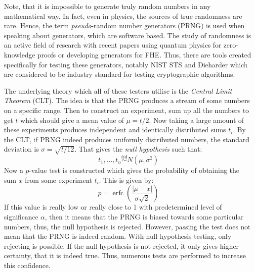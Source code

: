 \documentclass{Resources/UoBLab1}
\theoremstyle{definition}
\begin{document}
Note, that it is impossible to generate truly random numbers in any mathematical way. In fact, even in physics, the sources of true randomness are rare. Hence, the term \textit{pseudo}-random number generators (PRNG) is used when speaking about generators, which are software based. The study of randomness is an active field of research with recent papers using quantum physics for zero-knowledge proofs\cite{QuantumZK} or developing generators for FHE\cite{LatticeRNG}. Thus, there are tools created specifically for testing these generators, notably NIST STS\cite{NIST} and Dieharder\cite{Dieharder} which are considered to be industry standard for testing cryptographic algorithms\cite{AESNI}.

The underlying theory which all of these testers utilise is the \textit{Central Limit Theorem} (CLT). The idea is that the PRNG produces a stream of some numbers on a specific range. Then to construct an experiment, sum up all the numbers to get $t$ which should give a mean value of $\mu = t/2$. Now taking a large amount of these experiments produces independent and identically distributed sums $t_i$. By the CLT, if PRNG indeed produces uniformly distributed numbers, the standard deviation is $\sigma = \sqrt{t/12}$. That gives the \textit{null hypothesis} such that:
\[
    t_1, ..., t_n \overset{iid}{\sim} N(\mu, \sigma^2)
\]
Now a $p$-value test is constructed which gives the probability of obtaining the sum $x$ from some experiment $t_i$. This is given by:
\[
    p = \operatorname{erfc}\left(\frac{|\mu - x|}{\sigma\sqrt{2}}\right)
\]
If this value is really low or really close to 1 with predetermined level of significance $\alpha$, then it means that the PRNG is biased towards some particular numbers, thus, the null hypothesis is rejected. However, passing the test does not mean that the PRNG is indeed random. With null hypothesis testing, only rejecting is possible. If the null hypothesis is not rejected, it only gives higher certainty, that it is indeed true. Thus, numerous tests are performed to increase this confidence.\medskip
\end{document}
